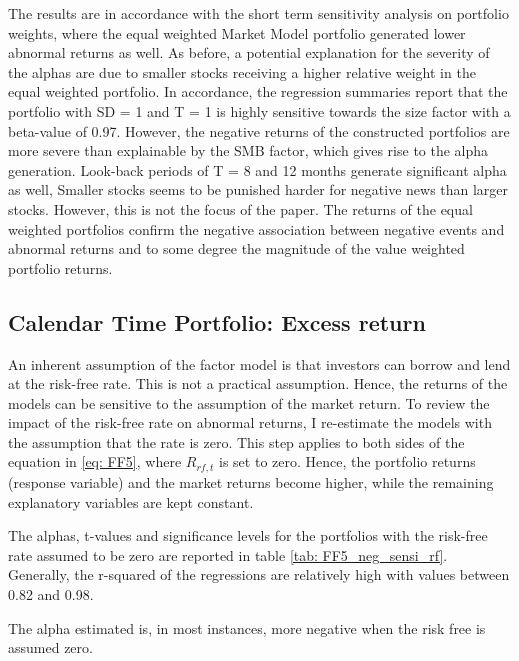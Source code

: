The results are in accordance with the short term sensitivity analysis on portfolio weights, where the equal weighted Market Model portfolio generated lower abnormal returns as well. As before, a potential explanation for the severity of the alphas are due to smaller stocks receiving a higher relative weight in the equal weighted portfolio. In accordance, the regression summaries report that the portfolio with SD = 1 and T = 1 is highly sensitive towards the size factor with a beta-value of 0.97. However, the negative returns of the constructed portfolios are more severe than explainable by the SMB factor, which gives rise to the alpha generation. Look-back periods of T = 8 and 12 months generate significant alpha as well,  Smaller stocks seems to be punished harder for negative news than larger stocks. However, this is not the focus of the paper. The returns of the equal weighted portfolios confirm the negative association between negative events and abnormal returns and to some degree the magnitude of the value weighted portfolio returns.


\subsection{Calendar Time Portfolio: Excess return}

An inherent assumption of the factor model is that investors can borrow and lend at the risk-free rate. This is not a practical assumption. Hence, the returns of the models can be sensitive to the assumption of the market return. 
To review the impact of the risk-free rate on abnormal returns, I re-estimate the models with the assumption that the rate is zero. This step applies to both sides of the equation in \ref{eq: FF5}, where $R_{rf,t}$ is set to zero. Hence, the portfolio returns (response variable) and the market returns become higher, while the remaining explanatory variables are kept constant. 

The alphas, t-values and significance levels for the portfolios with the risk-free rate assumed to be zero are reported in table \ref{tab: FF5_neg_sensi_rf}. Generally, the r-squared of the regressions are relatively high with values between 0.82 and 0.98. 

The alpha estimated is, in most instances, more negative when the risk free is assumed zero. 








